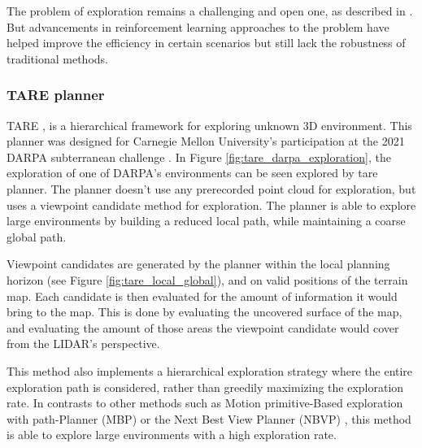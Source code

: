\documentclass[12pt]{article}
\begin{document}
        The problem of exploration remains a challenging and open one, as described in \cite{lluvia2021active}. But advancements in reinforcement learning approaches to the problem \cite{garaffa2021reinforcement} have helped improve the efficiency in certain scenarios but still lack the robustness of traditional methods.

        \subsubsection{TARE planner}

        TARE \cite{tare}, is a hierarchical framework for exploring unknown 3D environment. This planner was designed for Carnegie Mellon University's participation at the 2021 DARPA subterranean challenge \cite{darpa_subterranean_challenge}. In Figure \ref{fig:tare_darpa_exploration}, the exploration of one of DARPA's environments  can be seen explored by tare planner. The planner doesn't use any prerecorded point cloud for exploration, but uses a viewpoint candidate method for exploration. The planner is able to explore large environments by building a reduced local path, while maintaining a coarse global path.

        Viewpoint candidates are generated by the planner within the local planning horizon (see Figure \ref{fig:tare_local_global}), and on valid positions of the terrain map. Each candidate is then evaluated for the amount of information it would bring to the map. This is done by evaluating the uncovered surface of the map, and evaluating the amount of those areas the viewpoint candidate would cover from the LIDAR's perspective.  

        This method also implements a hierarchical exploration strategy where the entire exploration path is considered, rather than greedily maximizing the exploration rate. In contrasts to other methods such as Motion primitive-Based exploration with path-Planner (MBP) \cite{dharmadhikari2020motion} or the Next Best View Planner (NBVP) \cite{bircher2016receding}, this method is able to explore large environments with a high exploration rate.
\end{document}
